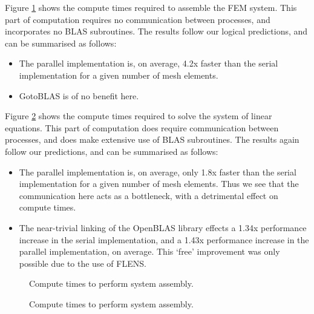Figure \ref{fig:assembly} shows the compute times required to assemble the FEM system. This part of computation requires no communication between processes, and incorporates no BLAS subroutines. The results follow our logical predictions, and can be summarised as follows:
\begin{itemize}
   \item The parallel implementation is, on average, 4.2x faster than the serial implementation for a given number of mesh elements.
   \item GotoBLAS is of no benefit here.
\end{itemize}

Figure \ref{fig:solver} shows the compute times required to solve the system of linear equations. This part of computation does require communication between processes, and does make extensive use of BLAS subroutines. The results again follow our predictions, and can be summarised as follows:
\begin{itemize}
   \item The parallel implementation is, on average, only 1.8x faster than the serial implementation for a given number of mesh elements. Thus we see that the communication here acts as a bottleneck, with a detrimental effect on compute times. 
   \item The near-trivial linking of the OpenBLAS library effects a 1.34x performance increase in the serial implementation, and a 1.43x performance increase in the parallel implementation, on average. This `free' improvement was only possible due to the use of FLENS.
\end{itemize}
\begin{figure}[H]
      \centering
      \newlength\figureheight
      \newlength\figurewidth
      \setlength\figureheight{7cm}
      \setlength\figurewidth{10cm}
      
      \caption{Compute times to perform system assembly.}
      \label{fig:assembly}
\end{figure}
\begin{figure}[H]
      \centering
      \setlength\figureheight{7cm}
      \setlength\figurewidth{10cm}
      
      \caption{Compute times to perform system assembly.}
      \label{fig:solver}
\end{figure}

